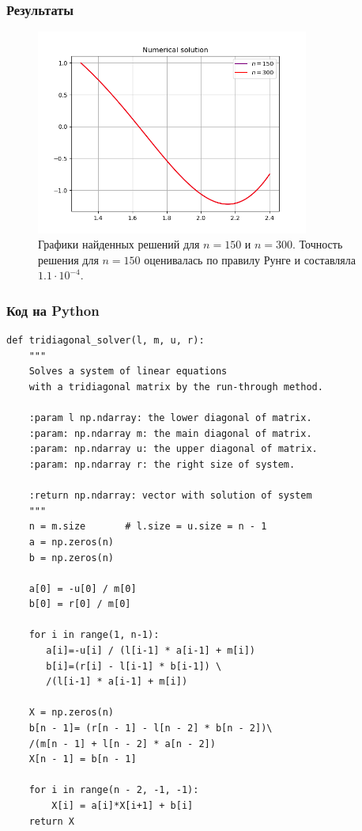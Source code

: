 \documentclass[12pt]{article}%
\begin{document}
\subsubsection{Результаты}
\begin{figure}[H]
    \centering
    \includegraphics[width=0.8\textwidth]{solutions.png}
    \caption{Графики найденных решений для $n=150$ и $n=300$. Точность решения для $n=150$ оценивалась по правилу Рунге и составляла $1.1 \cdot 10^{-4}$.}
\end{figure}

\subsubsection{Код на Python}
\begin{verbatim}
def tridiagonal_solver(l, m, u, r):
    """
    Solves a system of linear equations 
    with a tridiagonal matrix by the run-through method.

    :param l np.ndarray: the lower diagonal of matrix.
    :param: np.ndarray m: the main diagonal of matrix.
    :param: np.ndarray u: the upper diagonal of matrix.
    :param: np.ndarray r: the right size of system.

    :return np.ndarray: vector with solution of system
    """
    n = m.size       # l.size = u.size = n - 1
    a = np.zeros(n)
    b = np.zeros(n)

    a[0] = -u[0] / m[0]
    b[0] = r[0] / m[0]

    for i in range(1, n-1):
       a[i]=-u[i] / (l[i-1] * a[i-1] + m[i])
       b[i]=(r[i] - l[i-1] * b[i-1]) \
       /(l[i-1] * a[i-1] + m[i])

    X = np.zeros(n)
    b[n - 1]= (r[n - 1] - l[n - 2] * b[n - 2])\
    /(m[n - 1] + l[n - 2] * a[n - 2])
    X[n - 1] = b[n - 1]

    for i in range(n - 2, -1, -1):
        X[i] = a[i]*X[i+1] + b[i]
    return X
\end{verbatim}
\end{document}
